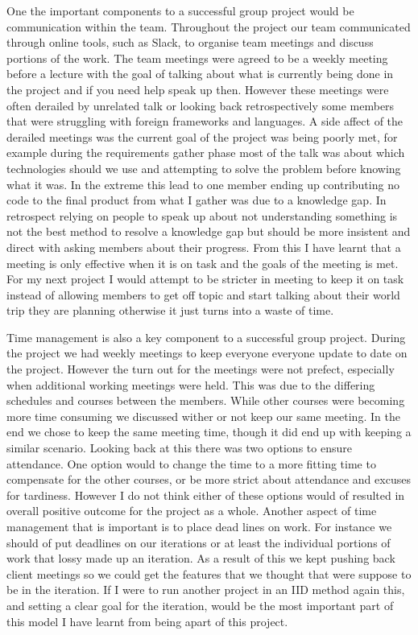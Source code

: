 \documentclass{style/CRPITStyle}
\begin{document}
\vspace{.1in}

One the important components to a successful group project would be communication within the team.
Throughout the project our team communicated through online tools, such as
Slack, to organise team meetings and discuss portions of the work. The team
meetings were agreed to be a weekly meeting before a lecture with the goal of
talking about what is currently being done in the project and if you need help
speak up then. However these meetings were often derailed by unrelated talk or
looking back retrospectively some members that were struggling with foreign
frameworks and languages.
A side affect of the derailed meetings was the current goal of the project was
being poorly met, for example during the requirements gather phase most of the
talk was about which technologies should we use and attempting to solve the
problem before knowing what it was.
In the extreme this lead to one member ending up
contributing no code to the final product from what I gather was due to a
knowledge gap. In retrospect relying on people to speak up about not understanding
something is not the best method to resolve a knowledge gap but should be more
insistent and direct with asking members about their progress.
From this I have learnt that a meeting is only effective when it is on task and
the goals of the meeting is met. For my next project I would attempt to be
stricter in meeting to keep it on task instead of allowing members to get off topic
and start talking about their world trip they are planning otherwise it just
turns into a waste of time.

\vspace{.1in}

Time management is also a key component to a successful group project.
During the project we had weekly meetings to keep everyone everyone update to
date on the project. However the turn out for the meetings were not prefect,
especially when additional working meetings were held. This was
due to the differing schedules and courses between the members. While other
courses were becoming more time consuming we discussed wither or not keep our
same meeting. In the end we chose to keep the same meeting time, though it did
end up with keeping a similar scenario. Looking back at this there was two
options to ensure attendance. One option would to change the time to a more
fitting time to compensate for the other courses, or be more strict about
attendance and excuses for tardiness. However I do not think either of these
options would of resulted in overall positive outcome for the project as a
whole. Another aspect of time management that is important is to place dead
lines on work. For instance we should of put deadlines on our iterations or at
least the individual portions of work that lossy made up an iteration. As a
result of this we kept pushing back client meetings so we could get the features
that we thought that were suppose to be in the iteration. If I were to run
another project in an IID method again this, and setting a clear goal for the
iteration, would be the most important part of this model I have learnt from
being apart of this project.
\end{document}
